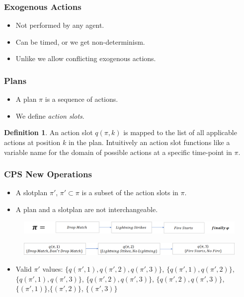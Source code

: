 \documentclass{beamer}
\theoremstyle{plain}
\theoremstyle{definition}
\newtheorem{defn}[thm]{Definition} %
\begin{document}
\begin{frame}
\frametitle{Exogenous Actions}
\begin{itemize}
\item Not performed by any agent.
\item Can be timed, or we get non-determinism.
\item Unlike \citet{lind2019ethical} we allow conflicting exogenous actions.
\end{itemize}

\end{frame}


\begin{frame}
\frametitle{Plans}
\begin{itemize}
\item A plan $\pi$ is a sequence of actions. 

\item We define \textit{action slots}. 

\end{itemize}


\begin{defn}
An action slot $q(\pi,k)$ is mapped to the list of all applicable actions at position $k$ in the plan. Intuitively an action slot functions like a variable name for the domain of possible actions at a specific time-point in $\pi$.
\end{defn}

\end{frame}


\begin{frame}
\frametitle{CPS New Operations}
\begin{itemize}
\item A slotplan $\pi'$, $\pi'\subset \pi$ is a subset of the action slots in $\pi$.
\item A plan and a slotplan are not interchangeable.
\end{itemize}

\begin{figure}
\includegraphics[scale=.30]{bobPlanOriginal}
\end{figure}
\begin{figure}
\includegraphics[scale=.35]{bobPlan}
\end{figure}

\begin{itemize}
\item Valid $\pi'$ values: $\{q(\pi',1),q(\pi',2),q(\pi',3)\}$, $\{q(\pi',1),q(\pi',2)\}$, $\{q(\pi',1),q(\pi',3)\}$, $\{q(\pi',2),q(\pi',3)\}$, $\{q(\pi',2),q(\pi',3)\}$, $\{(\pi',1)\}$,$\{(\pi',2)\}$, $\{(\pi',3)\}$
\end{itemize}

\end{frame}
\end{document}
